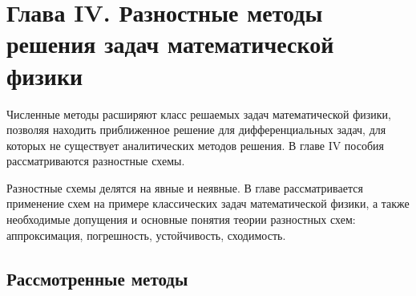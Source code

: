 \newpage
{}
\pagestyle{empty}
\vspace{0.5cm}

\section{Глава IV. Разностные методы решения задач математической физики}
Численные методы расширяют класс решаемых задач математической физики, позволяя находить приближенное решение для дифференциальных задач, для которых не существует аналитических методов решения. В главе IV пособия рассматриваются разностные схемы.

Разностные схемы делятся на явные и неявные. В главе рассматривается применение схем на примере классических задач математической физики, а также необходимые допущения и основные понятия теории разностных схем: аппроксимация, погрешность, устойчивость, сходимость.

\subsection{Рассмотренные методы}
